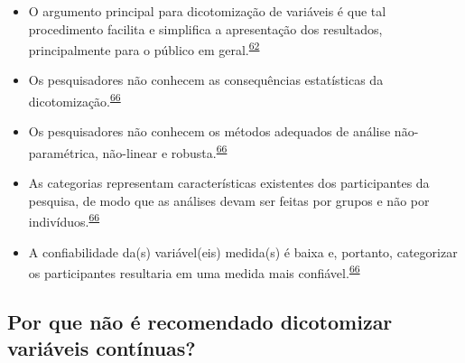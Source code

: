 \documentclass[
  a4paper,
]{book}
\begin{document}
\begin{itemize}
\item
  O argumento principal para dicotomização de variáveis é que tal procedimento facilita e simplifica a apresentação dos resultados, principalmente para o público em geral.\textsuperscript{\protect\hyperlink{ref-Fedorov2009}{62}}
\item
  Os pesquisadores não conhecem as consequências estatísticas da dicotomização.\textsuperscript{\protect\hyperlink{ref-MacCallum2002}{66}}
\item
  Os pesquisadores não conhecem os métodos adequados de análise não-paramétrica, não-linear e robusta.\textsuperscript{\protect\hyperlink{ref-MacCallum2002}{66}}
\item
  As categorias representam características existentes dos participantes da pesquisa, de modo que as análises devam ser feitas por grupos e não por indivíduos.\textsuperscript{\protect\hyperlink{ref-MacCallum2002}{66}}
\item
  A confiabilidade da(s) variável(eis) medida(s) é baixa e, portanto, categorizar os participantes resultaria em uma medida mais confiável.\textsuperscript{\protect\hyperlink{ref-MacCallum2002}{66}}
\end{itemize}

\hypertarget{por-que-nuxe3o-uxe9-recomendado-dicotomizar-variuxe1veis-contuxednuas}{%
\subsection{Por que não é recomendado dicotomizar variáveis contínuas?}\label{por-que-nuxe3o-uxe9-recomendado-dicotomizar-variuxe1veis-contuxednuas}}
\end{document}
